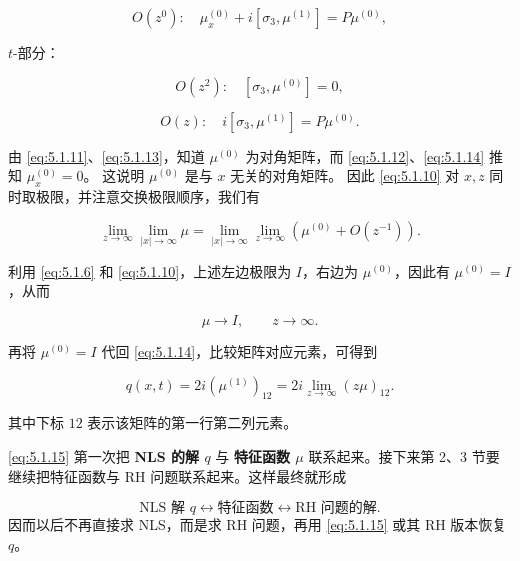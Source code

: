 \documentclass[
    lang=cn,
    scheme=chinese,
    mode=simple,
    device=normal,
    color=blue,
    math=cm,
    thmcnt=section,
    12pt,
    nowatermark
]{elegantbook}
\begin{document}
\begin{equation}
    O(z^0):\quad\mu_x^{(0)}+i[\sigma_3,\mu^{(1)}]=P\mu^{(0)},
    \tag{5.1.12}
    \label{eq:5.1.12}
\end{equation}

$t$-部分：

\begin{equation}
    O(z^2):\quad[\sigma_3,\mu^{(0)}]=0,
    \tag{5.1.13}
    \label{eq:5.1.13}
\end{equation}

\begin{equation}
    O(z):\quad i[\sigma_3,\mu^{(1)}]=P\mu^{(0)}.
    \tag{5.1.14}
    \label{eq:5.1.14}
\end{equation}

由 \eqref{eq:5.1.11}、\eqref{eq:5.1.13}，知道 $\mu^{(0)}$ 为对角矩阵，而 \eqref{eq:5.1.12}、\eqref{eq:5.1.14} 推知 $\mu_x^{(0)}=0$。
这说明 $\mu^{(0)}$ 是与 $x$ 无关的对角矩阵。
因此 \eqref{eq:5.1.10} 对 $x,z$ 同时取极限，并注意交换极限顺序，我们有

\[
    \lim\limits_{z\to\infty}\lim\limits_{\lvert x\rvert\to\infty}\mu
    =
    \lim\limits_{\lvert x\rvert\to\infty}\lim\limits_{z\to\infty}\left(\mu^{(0)}+O(z^{-1})\right).
\]

利用 \eqref{eq:5.1.6} 和 \eqref{eq:5.1.10}，上述左边极限为 $I$，右边为 $\mu^{(0)}$，因此有 $\mu^{(0)}=I$，从而

\[
    \mu\to I,\qquad z\to\infty.
\]

再将 $\mu^{(0)}=I$ 代回 \eqref{eq:5.1.14}，比较矩阵对应元素，可得到

\begin{equation}
    q(x,t)
    =
    2i(\mu^{(1)})_{12}
    =
    2i\lim\limits_{z\to\infty}(z\mu)_{12}.
    \tag{5.1.15}
    \label{eq:5.1.15}
\end{equation}

其中下标 $12$ 表示该矩阵的第一行第二列元素。

\begin{callout}
    \eqref{eq:5.1.15} 第一次把 \textbf{NLS 的解 $q$} 与 \textbf{特征函数 $\mu$} 联系起来。接下来第 2、3 节要继续把特征函数与 RH 问题联系起来。这样最终就形成

    \[
        \text{NLS 解 }q
        \longleftrightarrow
        \text{特征函数}
        \longleftrightarrow
        \text{RH 问题的解}.
    \]
    因而以后不再直接求 NLS，而是求 RH 问题，再用 \eqref{eq:5.1.15} 或其 RH 版本恢复 $q$。
\end{callout}
\end{document}
